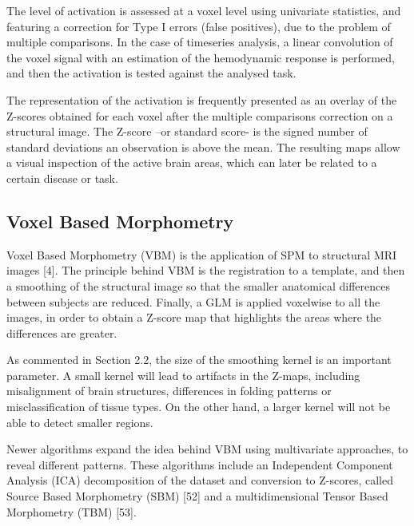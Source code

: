 The level of activation is assessed at a voxel level using univariate statistics, and featuring a correction for Type I errors (false positives), due to the problem of multiple comparisons. In the case of timeseries analysis, a linear convolution of the voxel signal with an estimation of the hemodynamic response is performed, and then the activation is tested against the analysed task. 

The representation of the activation is frequently presented as an overlay of the Z-scores obtained for each voxel after the multiple comparisons correction on a structural image. The Z-score –or standard score- is the signed number of standard deviations an observation is above the mean. The resulting maps allow a visual inspection of the active brain areas, which can later be related to a certain disease or task. 
\subsection{Voxel Based Morphometry}
Voxel Based Morphometry (VBM) is the application of SPM to structural MRI images [4]. The principle behind VBM is the registration to a template, and then a smoothing of the structural image so that the smaller anatomical differences between subjects are reduced. Finally, a GLM is applied voxelwise to all the images, in order to obtain a Z-score map that highlights the areas where the differences are greater. 

As commented in Section 2.2, the size of the smoothing kernel is an important parameter. A small kernel will lead to artifacts in the Z-maps, including misalignment of brain structures, differences in folding patterns or misclassification of tissue types. On the other hand, a larger kernel will not be able to detect smaller regions. 

Newer algorithms expand the idea behind VBM using multivariate approaches, to reveal different patterns. These algorithms include an Independent Component Analysis (ICA) decomposition of the dataset and conversion to Z-scores, called Source Based Morphometry (SBM) [52] and a multidimensional Tensor Based Morphometry (TBM) [53]. 

